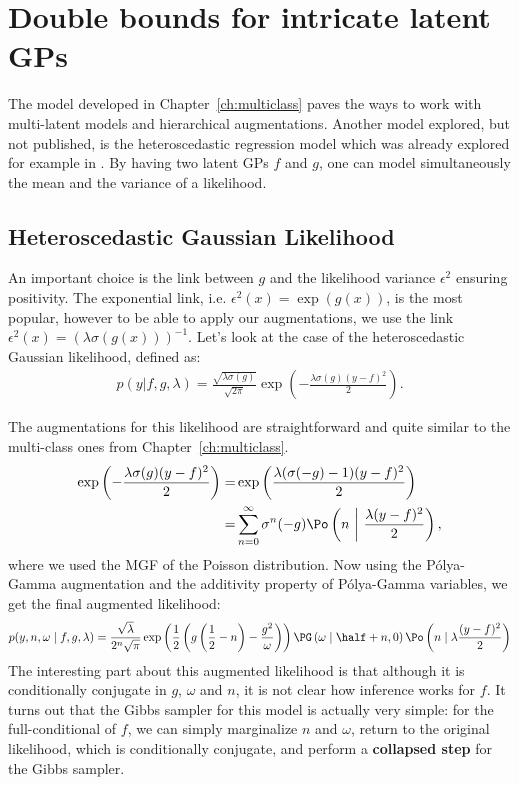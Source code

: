
\section{Double bounds for intricate latent GPs}
\label{sec:heteroscedastic}
The model developed in Chapter~\ref{ch:multiclass} paves the ways to work with multi-latent models and hierarchical augmentations.
Another model explored, but not published, is the heteroscedastic regression model which was already explored for example in \cite{wangGaussianProcessRegression2012,lazaro-gredillaVariationalHeteroscedasticGaussian}.
By having two latent \ac{GPs} $f$ and $g$, one can model simultaneously the mean and the variance of a likelihood.

\subsection{Heteroscedastic Gaussian Likelihood}

An important choice is the link between $g$ and the likelihood variance $\epsilon^2$ ensuring positivity.
The exponential link, i.e. $\epsilon^2(x) = \exp(g(x))$, is the most popular, however to be able to apply our augmentations, we use the link $\epsilon^2(x) = \left(\lambda \sigma(g(x))\right)^{-1}$.
Let's look at the case of the heteroscedastic Gaussian likelihood, defined as:
\begin{align}
    p(y|f,g,\lambda) = \frac{\sqrt{\lambda \sigma(g)}}{\sqrt{2\pi}}\exp\left(-\frac{\lambda \sigma(g)(y-f)^2}{2}\right).\label{eq:hetero_lik}
\end{align}

The augmentations for this likelihood are straightforward and quite similar to the multi-class ones from Chapter~\ref{ch:multiclass}.
\begin{align*}
    \exp\left(-\frac{\lambda\sigma(g)(y-f)^2}{2}\right) =& \exp\left(\frac{\lambda(\sigma(-g) -1)(y-f)^2}{2}\right)\\
    =&\sum_{n=0}^\infty \sigma^n(-g)\Po \left(n~\middle|~\frac{\lambda(y-f)^2}{2}\right),
\end{align*}
where we used the \ac{MGF} of the Poisson distribution.
Now using the P\'olya-Gamma augmentation and the additivity property of P\'olya-Gamma variables, we get the final augmented likelihood:
\begin{align}
    p(y,n,\omega\mid f,g,\lambda) = \frac{\sqrt{\lambda}}{2^n\sqrt{\pi}}\exp\left(\frac{1}{2}\left(g\left(\frac{1}{2}-n\right) - \frac{g^2}{\omega}\right)\right)\PG \left(\omega \mid \half + n, 0\right) \Po \left(n \mid \lambda\frac{(y-f)^2}{2}\right)\label{eq:heteroscedastic}
\end{align}
The interesting part about this augmented likelihood is that although it is conditionally conjugate in $g$, $\omega$ and $n$, it is not clear how inference works for $f$.
It turns out that the Gibbs sampler for this model is actually very simple: for the full-conditional of $f$, we can simply marginalize $n$ and $\omega$, return to the original likelihood, which is conditionally conjugate, and perform a \textbf{collapsed step} for the Gibbs sampler.

